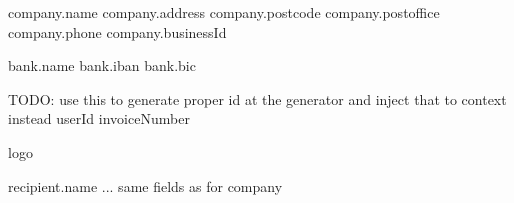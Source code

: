 {company.name}
{company.address}
{company.postcode}
{company.postoffice}
{company.phone}
{company.businessId}

{bank.name}
{bank.iban}
{bank.bic}

TODO: use this to generate proper id at the generator and inject that to context instead
{userId}
{invoiceNumber}

{logo}

{recipient.name}
... same fields as for company
